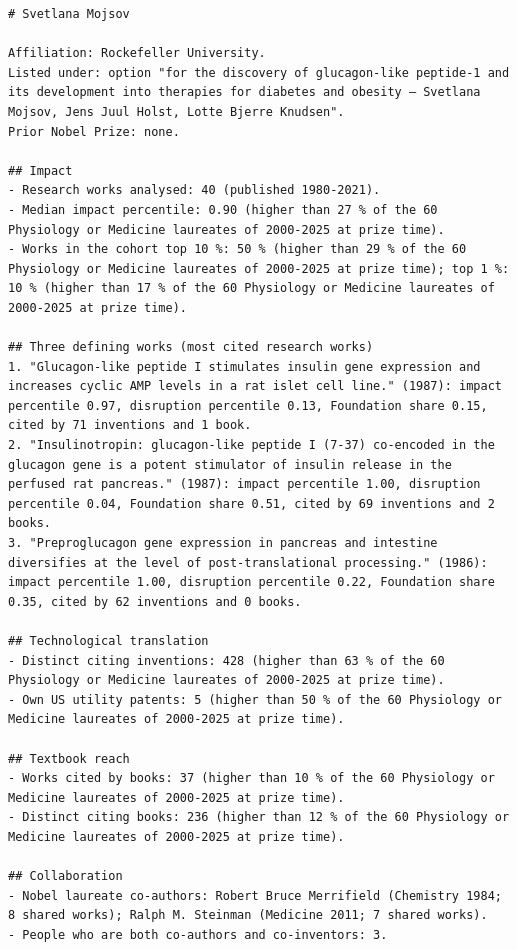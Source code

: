 \documentclass[11pt]{article}
\begin{document}
\begin{Verbatim}
# Svetlana Mojsov

Affiliation: Rockefeller University.
Listed under: option "for the discovery of glucagon-like peptide-1 and its development into therapies for diabetes and obesity — Svetlana Mojsov, Jens Juul Holst, Lotte Bjerre Knudsen".
Prior Nobel Prize: none.

## Impact
- Research works analysed: 40 (published 1980-2021).
- Median impact percentile: 0.90 (higher than 27 % of the 60 Physiology or Medicine laureates of 2000-2025 at prize time).
- Works in the cohort top 10 %: 50 % (higher than 29 % of the 60 Physiology or Medicine laureates of 2000-2025 at prize time); top 1 %: 10 % (higher than 17 % of the 60 Physiology or Medicine laureates of 2000-2025 at prize time).

## Three defining works (most cited research works)
1. "Glucagon-like peptide I stimulates insulin gene expression and increases cyclic AMP levels in a rat islet cell line." (1987): impact percentile 0.97, disruption percentile 0.13, Foundation share 0.15, cited by 71 inventions and 1 book.
2. "Insulinotropin: glucagon-like peptide I (7-37) co-encoded in the glucagon gene is a potent stimulator of insulin release in the perfused rat pancreas." (1987): impact percentile 1.00, disruption percentile 0.04, Foundation share 0.51, cited by 69 inventions and 2 books.
3. "Preproglucagon gene expression in pancreas and intestine diversifies at the level of post-translational processing." (1986): impact percentile 1.00, disruption percentile 0.22, Foundation share 0.35, cited by 62 inventions and 0 books.

## Technological translation
- Distinct citing inventions: 428 (higher than 63 % of the 60 Physiology or Medicine laureates of 2000-2025 at prize time).
- Own US utility patents: 5 (higher than 50 % of the 60 Physiology or Medicine laureates of 2000-2025 at prize time).

## Textbook reach
- Works cited by books: 37 (higher than 10 % of the 60 Physiology or Medicine laureates of 2000-2025 at prize time).
- Distinct citing books: 236 (higher than 12 % of the 60 Physiology or Medicine laureates of 2000-2025 at prize time).

## Collaboration
- Nobel laureate co-authors: Robert Bruce Merrifield (Chemistry 1984; 8 shared works); Ralph M. Steinman (Medicine 2011; 7 shared works).
- People who are both co-authors and co-inventors: 3.
\end{Verbatim}
\end{document}
